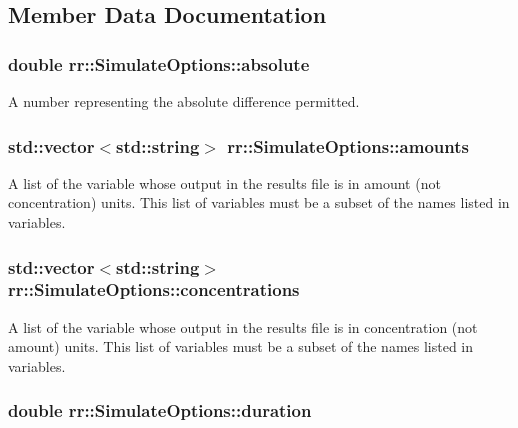\subsection{Member Data Documentation}
\hypertarget{structrr_1_1_simulate_options_a145102fab96b7452f7a8fae880c01353}{
\subsubsection[{absolute}]{\setlength{\rightskip}{0pt plus 5cm}double rr\-::\-Simulate\-Options\-::absolute}}\label{structrr_1_1_simulate_options_a145102fab96b7452f7a8fae880c01353}
A number representing the absolute difference permitted. \hypertarget{structrr_1_1_simulate_options_a13c457ced6a6396d9cb8dcecf42f0dee}{
\subsubsection[{amounts}]{\setlength{\rightskip}{0pt plus 5cm}std\-::vector$<$std\-::string$>$ rr\-::\-Simulate\-Options\-::amounts}}\label{structrr_1_1_simulate_options_a13c457ced6a6396d9cb8dcecf42f0dee}
A list of the variable whose output in the results file is in amount (not concentration) units. This list of variables must be a subset of the names listed in variables. \hypertarget{structrr_1_1_simulate_options_a3fb8836610f52922ee371fdf06331e97}{
\subsubsection[{concentrations}]{\setlength{\rightskip}{0pt plus 5cm}std\-::vector$<$std\-::string$>$ rr\-::\-Simulate\-Options\-::concentrations}}\label{structrr_1_1_simulate_options_a3fb8836610f52922ee371fdf06331e97}
A list of the variable whose output in the results file is in concentration (not amount) units. This list of variables must be a subset of the names listed in variables. \hypertarget{structrr_1_1_simulate_options_a6917a73a48307d38643923182b28b0c4}{
\subsubsection[{duration}]{\setlength{\rightskip}{0pt plus 5cm}double rr\-::\-Simulate\-Options\-::duration}}\label{structrr_1_1_simulate_options_a6917a73a48307d38643923182b28b0c4}
